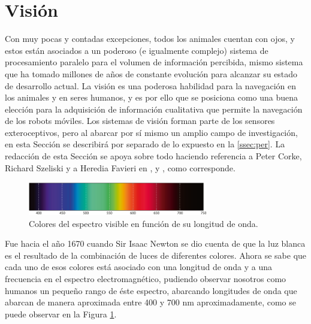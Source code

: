 \section{Visión}
\label{sec:vi}
Con muy pocas y contadas excepciones, todos los animales cuentan con ojos, y estos están asociados a un poderoso (e igualmente complejo) sistema de procesamiento paralelo para el volumen de información percibida, mismo sistema que ha tomado millones de años de constante evolución para alcanzar su estado de desarrollo actual. La visión es una poderosa habilidad para la navegación en los animales y en seres humanos, y es por ello que se posiciona como una buena elección para la adquisición de información cualitativa que permite la navegación de los robots móviles. Los sistemas de visión forman parte de los sensores exteroceptivos, pero al abarcar por sí mismo un amplio campo de investigación, en esta Sección se describirá por separado de lo expuesto en la \autoref{ssec:per}. La redacción de esta Sección se apoya sobre todo haciendo referencia a Peter Corke, Richard Szeliski y a Heredia Favieri en \cite{corkeRoboticsVisionControl2017},  \cite{szeliskiComputerVisionAlgorithms2011} y \cite{herediafavieriReconocimientoObjetosImagenes2015}, como corresponde.
\begin{figure}[htbp!]
	\centering
	\includegraphics[width=0.7\textwidth]{./Figuras/Espectro}
	\caption{Colores del espectro visible en función de su longitud de onda.}
	\label{fig:espectro}
\end{figure}
\par Fue hacia el año 1670 cuando Sir Isaac Newton se dio cuenta de que la luz blanca es el resultado de la combinación de luces de diferentes colores. Ahora se sabe que cada uno de esos colores está asociado con una longitud de onda y a una frecuencia en el espectro electromagnético, pudiendo observar nosotros como humanos un pequeño rango de éste espectro, abarcando longitudes de onda que abarcan de manera aproximada entre 400 y 700 nm aproximadamente, como se puede observar en la Figura \ref{fig:espectro}.
